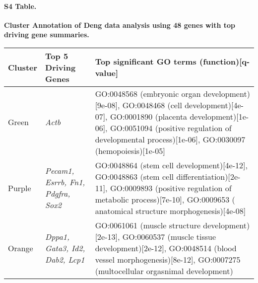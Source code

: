 \documentclass[10pt,letterpaper]{article}
\begin{document}
\paragraph*{S4 Table.}
\label{supptab4}
{\bf Cluster Annotation of Deng data analysis using 48 genes with top driving gene summaries.}

\begin{table}[!hp]
\begin{adjustwidth}{-.5in}{0in}
\begin{tabular}{|p{1.0in}|p{1.0in}|p{5.0in}|}
\hline
Cluster & Top 5 Driving \qquad Genes  &  Top significant GO terms (function)[q-value] \\
\hline

Green &  \textit{Actb} & GO:0048568 (embryonic organ development)[9e-08],
GO:0048468 (cell development)[4e-07],  GO:0001890 (placenta development)[1e-06], GO:0051094 (positive
regulation of developmental process)[1e-06],  GO:0030097 (hemopoiesis)[1e-05] \\ \hline

Purple &  \textit{Pecam1, Esrrb, Fn1, Pdgfra, Sox2} &  GO:0048864 (stem cell development)[4e-12], GO:0048863
(stem cell differentiation)[2e-11], GO:0009893 (positive regulation of metabolic process)[7e-10], GO:0009653 (
anatomical structure morphogenesis)[4e-08] \\ \hline

Orange & \textit{Dppa1, Gata3, Id2, Dab2, Lcp1} & GO:0061061 (muscle structure development)[2e-13],
GO:0060537 (muscle tissue development)[2e-12], GO:0048514 (blood vessel morphogenesis)[8e-12],
GO:0007275 (multocellular orgasnimal development) \\ \hline
\end{tabular}
\end{adjustwidth}
\end{table}
\end{document}

